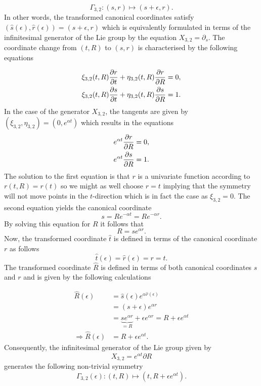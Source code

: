 $$\Gamma_{3,2}:(s,r)\mapsto(s+\epsilon,r).$$
In other words, the transformed canonical coordinates satisfy $(\hat{s}(\epsilon),\hat{r}(\epsilon))=(s+\epsilon,r)$ which is equivalently formulated in terms of the infinitesimal generator of the Lie group by the equation $X_{3,2}=\partial_s$. The coordinate change from $(t,R)$ to $(s,r)$ is characterised by the following equations \cite{hydon2000symmetry}

\begin{align*}
\xi_{3,2}(t,R)\pdv{r}{t}+\eta_{3,2}(t,R)\pdv{r}{R}&=0,\\
\xi_{3,2}(t,R)\pdv{s}{t}+\eta_{3,2}(t,R)\pdv{s}{R}&=1.\\
\end{align*}
In the case of the generator $X_{3,2}$, the tangents are given by $(\xi_{3,2},\eta_{3,2})=\left(0,e^{\alpha t}\right)$ which results in the equations
\begin{align*}
e^{\alpha t}\pdv{r}{R}&=0,\\
e^{\alpha t}\pdv{s}{R}&=1.\\
\end{align*}
The solution to the first equation is that $r$ is a univariate function according to $r(t,R)=r(t)$ so we might as well choose $r=t$ implying that the symmetry will not move points in the $t$-direction which is in fact the case as $\xi_{3,2}=0$. The second equation yields the canonical coordinate
$$s=Re^{-\alpha t}=Re^{-\alpha r}.$$
By solving this equation for $R$ it follows that
$$R=se^{\alpha r}.$$
Now, the transformed coordinate $\hat{t}$ is defined in terms of the canonical coordinate $r$ as follows
$$\hat{t}(\epsilon)=\hat{r}(\epsilon)=r=t.$$
The transformed coordinate $\hat{R}$ is defined in terms of both canonical coordinates $s$ and $r$ and is given by the following calculations

\begin{align*}
  \hat{R}(\epsilon)&=\hat{s}(\epsilon)e^{\alpha \hat{r}(\epsilon)}\\
         &=\left(s+\epsilon\right)e^{\alpha r}\\
         &=\underset{=R}{\underbrace{se^{\alpha r}}}+\epsilon e^{\alpha r}=R+\epsilon e^{\alpha t}\\
    \Longrightarrow \hat{R}(\epsilon)&=R+\epsilon e^{\alpha t}.
\end{align*}
Consequently, the infinitesimal generator of the Lie group given by
$$X_{3,2}=e^{\alpha t}\partial R$$
generates the following non-trivial symmetry
$$\Gamma_{3,2}(\epsilon):(t,R)\mapsto (t,R+\epsilon e^{\alpha t}) .$$
